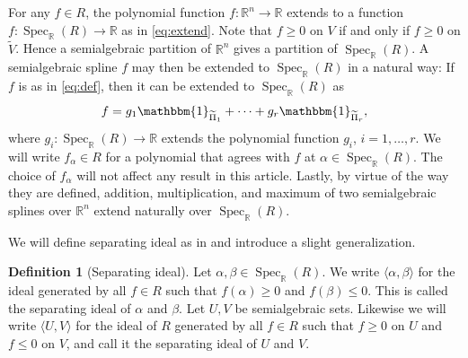 \documentclass[11pt]{amsart}
\theoremstyle{plain}
\theoremstyle{definition}
\newtheorem{definition}[theorem]{Definition}
\DeclareMathOperator{\Spec}{Spec}
\begin{document}
For any $f \in R$, the polynomial function $f : \mathbb{R}^n \to \mathbb{R}$ extends to a function $f : \Spec_{\mathbb{R}}(R) \to \mathbb{R}$ as in \eqref{eq:extend}. Note that $f \ge 0$ on $V$ if and only if $f \ge 0$ on $\widetilde{V}$. Hence a semialgebraic partition of $\mathbb{R}^n$ gives a partition of $\Spec_{\mathbb{R}}(R)$. A semialgebraic spline $f$ may then be extended to $\Spec_{\mathbb{R}}(R)$ in a natural way: If $f$ is as in \eqref{eq:def}, then it can be extended to $\Spec_{\mathbb{R}}(R)$ as
\[
f = g_1 \mathbbm{1}_{\widetilde{\Pi}_1} + \dots +  g_r \mathbbm{1}_{\widetilde{\Pi}_r},
\]
where $g_i : \Spec_{\mathbb{R}}(R) \to \mathbb{R}$ extends the polynomial function $g_i$, $i =1,\dots,r$. We will write $f_\alpha \in R$ for a polynomial that agrees with $f$ at $\alpha \in  \Spec_{\mathbb{R}}(R)$. The choice of $f_{\alpha}$ will not affect any result in this article. Lastly, by virtue of the way they are defined, addition, multiplication, and maximum of two semialgebraic splines over $\mathbb{R}^n$ extend naturally over $\Spec_{\mathbb{R}}(R)$.

We will define separating ideal as in \cite{Madden1989} and introduce a slight generalization.
\begin{definition}[Separating ideal]
Let $\alpha, \beta \in \Spec_{\mathbb{R}}(R)$. We write $\langle \alpha, \beta \rangle$ for the ideal generated by all $f \in R$ such that $f(\alpha) \ge 0$ and $f(\beta) \le 0$.  This is called the separating ideal of $\alpha$ and $\beta$. Let $U, V$ be semialgebraic sets. Likewise we will write $\langle U, V \rangle$ for the ideal of $R$ generated by all $f \in R$ such that $f \ge 0$ on $U$ and $f \le 0$ on $V$, and call it the separating ideal of $U$ and $V$.
\end{definition}
\end{document}
